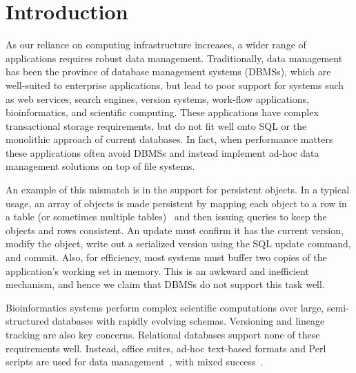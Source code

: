 \documentclass[letterpaper,twocolumn,10pt]{article}
\begin{document}




\section{Introduction}

As our reliance on computing infrastructure increases, a wider range
of applications requires robust data management.  Traditionally, data
management has been the province of database management systems
(DBMSs), which are well-suited to enterprise applications, but lead to
poor support for systems such as web services, search engines, version
systems, work-flow applications, bioinformatics, and
scientific computing.  These applications have complex transactional
storage requirements, but do not fit well onto SQL or the monolithic
approach of current databases.  In fact, when performance matters
these applications often avoid DBMSs and instead implement ad-hoc data
management solutions on top of file systems.

An example of this mismatch is in the support for persistent objects.
In a typical usage, an array of objects is made persistent by mapping
each object to a row in a table (or sometimes multiple
tables)~\cite{hibernate} and then issuing queries to keep the objects
and rows consistent. An update must confirm it has the current
version, modify the object, write out a serialized version using the
SQL update command, and commit.  Also, for efficiency, most systems
must buffer two copies of the application's working set in memory.
This is an awkward and inefficient mechanism, and hence we claim that
DBMSs do not support this task well.

Bioinformatics systems perform complex scientific computations over
large, semi-structured databases with rapidly evolving schemas.
Versioning and lineage tracking are also key concerns.  Relational
databases support none of these requirements well.  Instead, office
suites, ad-hoc text-based formats and Perl scripts are used for data
management~\cite{perl}, with mixed success~\cite{excel}.
\end{document}

